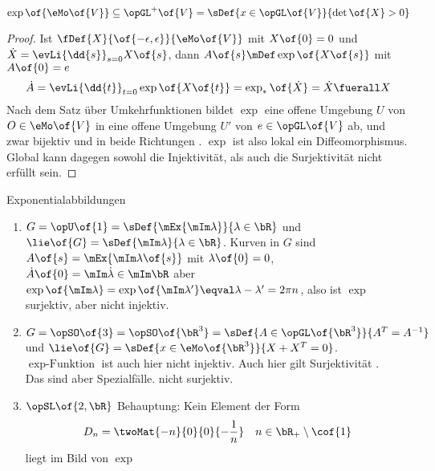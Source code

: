 \begin{korollar}
	\begin{equation}
		\exp\of{\eMo\of{V}} \subseteq \opGL^{+}\of{V} = \sDef{x \in \opGL\of{V}}{\det\of{X} > 0}
	\end{equation}
\end{korollar}
\begin{proof}
	Ist $\fDef{X}{\of{-\epsilon,\epsilon}}{\eMo\of{V}}$ mit $X\of{0} = 0$ und $\dot{X} = \evLi{\dd{s}}_{s=0} X\of{s}$, dann $A\of{s} \mDef \exp\of{X\of{s}}$ mit $A\of{0} = e$
	\begin{equation}
		\dot{A} = \evLi{\dd{t}}_{t=0}\exp\of{X\of{t}} = \exp_{*} \of{\dot{X}} = \dot{X} \fuerall X
	\end{equation}
	Nach dem Satz über Umkehrfunktionen bildet $\exp$ eine offene Umgebung $U$ von $O \in \eMo\of{V}$ in eine offene Umgebung $U'$ von $e \in \opGL\of{V}$ ab, und zwar bijektiv und in beide Richtungen \difb. $\exp$ ist also lokal ein Diffeomorphismus. Global kann dagegen sowohl die Injektivität, als auch die Surjektivität nicht erfüllt sein.
\end{proof}
\begin{beispiel} 
	Exponentialabbildungen
	\begin{enumerate}
		\item $G = \opU\of{1} = \sDef{\mEx{\mIm\lambda}}{\lambda \in \bR}$ und $\lie\of{G} = \sDef{\mIm\lambda}{\lambda\in\bR}$. Kurven in $G$ sind \exmpl $A\of{s} = \mEx{\mIm\lambda\of{s}}$ mit $\lambda\of{0} = 0$, $\dot{A}\of{0} = \mIm\dot{\lambda} \in \mIm \bR$ aber $\exp\of{\mIm\lambda} = \exp\of{\mIm\lambda'} \eqval \lambda - \lambda' = 2 \pi n$, also ist $\exp$ surjektiv, aber nicht injektiv.
		\item $G = \opSO\of{3} = \opSO\of{\bR^3} = \sDef{A \in \opGL\of{\bR^3}}{A^T = A^{-1}}$ und $\lie\of{G} = \sDef{x \in \eMo\of{\bR^3}}{X + X^T = 0}$. $\exp\text{-Funktion}$ ist auch hier nicht injektiv. Auch hier gilt Surjektivität . \\
		Das sind aber Spezialfälle. \iall nicht surjektiv.
		\item $\opSL\of{2,\bR}$ Behauptung: Kein Element der Form 
		\begin{equation}
			D_n = \twoMat{-n}{0}{0}{-\frac{1}{n}} \quad n \in \bR_+\setminus \cof{1}
		\end{equation}
		liegt im Bild von $\exp$
	\end{enumerate}
\end{beispiel}

